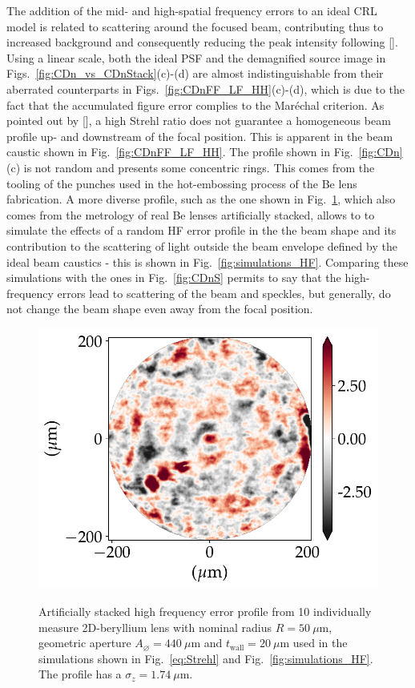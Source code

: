 \begin{refsection}
The addition of the mid- and high-spatial frequency errors to an ideal CRL model is related to scattering around the focused beam, contributing thus to increased background and consequently reducing the peak intensity following [\cite{Harvey1995a}]. Using a linear scale, both the ideal PSF and the demagnified source image in Figs.~\ref{fig:CDn_vs_CDnStack}(c)-(d) are almost indistinguishable from their aberrated counterparts in Figs.~\ref{fig:CDnFF_LF_HH}(c)-(d), which is due to the fact that the accumulated figure error complies to the Mar\'echal criterion. As pointed out by [\cite{Cocco2015, Cocco2019}], a high Strehl ratio does not guarantee a homogeneous beam profile up- and downstream of the focal position. This is apparent in the beam caustic shown in Fig.~\ref{fig:CDnFF_LF_HH}. The profile shown in Fig.~\ref{fig:CDn}(c) is not random and presents some concentric rings. This comes from the tooling of the punches used in the hot-embossing process of the Be lens fabrication. A more diverse profile, such as the one shown in Fig.~\ref{fig:CDnHF}, which also comes from the metrology of real Be lenses artificially stacked, allows to to simulate the effects of a random HF error profile in the the beam shape and its contribution to the scattering of light outside the beam envelope defined by the ideal beam caustics - this is shown in Fig.~\ref{fig:simulations_HF}. Comparing these simulations with the ones in Fig.~\ref{fig:CDnS} permits to say that the high-frequency errors lead to scattering of the beam and speckles, but generally, do not change the beam shape even away from the focal position.

\begin{figure}[t]
        \centering
        {\includegraphics[width=0.3\linewidth]{figures/ch05/CDnHF/phase_n_CRL_errors_residues_phase_figure_errors_FF}}
        \caption[High frequency errors profile]{Artificially stacked high frequency error profile from 10 individually measure 2D-beryllium lens with nominal radius $R=50~\mu\text{m}$, geometric aperture $A_{\diameter}=440~\mu\text{m}$ and $t_\text{wall}=20~\mu$m used in the simulations shown in Fig.~\ref{eq:Strehl} and Fig.~\ref{fig:simulations_HF}. The profile has a $\sigma_z=1.74~\mu$m.}\label{fig:CDnHF}
\end{figure}


\end{refsection}

